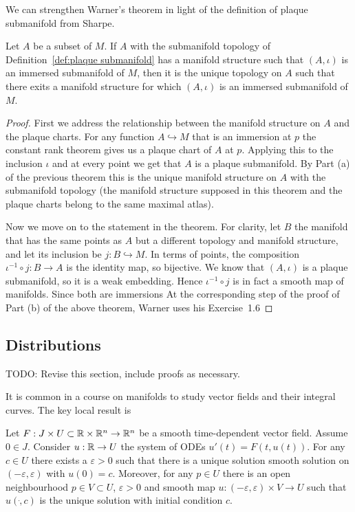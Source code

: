 We can strengthen Warner's theorem in light of the definition of plaque submanifold from Sharpe.
\begin{theorem}\label{thm:unique manifold structure}
Let $A$ be a subset of $M$. If $A$ with the submanifold topology of Definition~\ref{def:plaque submanifold} has a manifold structure such that $(A,\iota)$ is an immersed submanifold of $M$, then it is the unique topology on $A$ such that there exits a manifold structure for which $(A,\iota)$ is an immersed submanifold of $M$.
\end{theorem}
\begin{proof}
First we address the relationship between the manifold structure on $A$ and the plaque charts.
For any function $A \hookrightarrow M$ that is an immersion at $p$ the constant rank theorem gives us a plaque chart of $A$ at $p$.
Applying this to the inclusion $\iota$ and at every point we get that $A$ is a plaque submanifold.
By Part (a) of the previous theorem this is the unique manifold structure on $A$ with the submanifold topology (the manifold structure supposed in this theorem and the plaque charts belong to the same maximal atlas).

Now we move on to the statement in the theorem.
For clarity, let $B$ the manifold that has the same points as $A$ but a different topology and manifold structure, and let its inclusion be $j : B \hookrightarrow M$.
In terms of points, the composition $\iota^{-1} \circ j : B \to A$ is the identity map, so bijective.
We know that $(A,\iota)$ is a plaque submanifold, so it is a weak embedding.
Hence $\iota^{-1} \circ j$ is in fact a smooth map of manifolds.
Since both are immersions
At the corresponding step of the proof of Part (b) of the above theorem, Warner uses his Exercise~1.6
\end{proof}


\subsection{Distributions}

TODO: Revise this section, include proofs as necessary.

It is common in a course on manifolds to study vector fields and their integral curves.
The key local result is
\begin{theorem}
Let $F : J \times U \subset \mathbb{R}\times\mathbb{R}^n \to \mathbb{R}^n$ be a smooth time-dependent vector field. 
Assume $0 \in J$. 
Consider $u : \mathbb{R} \to U$ the system of ODEs $u'(t) = F(t,u(t))$.
For any $c \in U$ there exists a $\varepsilon > 0$ such that there is a unique solution smooth solution on $(-\varepsilon,\varepsilon)$ with $u(0) = c$.
Moreover, for any $p \in U$ there is an open neighbourhood $p \in V \subset U$, $\varepsilon > 0$ and smooth map $u : (-\varepsilon,\varepsilon) \times V \to U$ such that $u(\dot,c)$ is the unique solution with initial condition $c$.
\\\textup{\cite[Theorem~2.1.1]{Sharpe1997}}\cite[Theorem~1.2.1]{Ivey}
\end{theorem}

